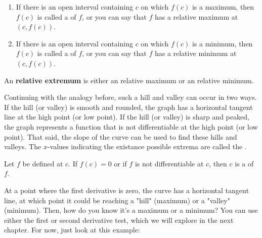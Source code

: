 \begin{definition}\hfil
    \begin{enumerate}
        \item If there is an open interval containing $c$ on which $f(c)$ is a maximum, then $f(c)$ is called a  of $f$, or you can say that $f$ has a relative maximum at $(c, f(c))$.
        \item If there is an open interval containing $c$ on which $f(c)$ is a minimum, then $f(c)$ is called a  of $f$, or you can say that $f$ has a relative minimum at $(c, f(c))$.
    \end{enumerate}
    An \textbf{relative extremum} is either an relative maximum or an relative minimum.
    \\\cite{ci}
\end{definition}

Continuing with the analogy before, such a hill and valley can occur in two ways. If the hill (or valley) is smooth and rounded, the graph has a horizontal tangent line at the high point (or low point). If the hill (or valley) is sharp and peaked, the graph represents a function that is not differentiable at the high point (or low point). \cite{ci} That said, the slope of the curve can be used to find these hills and valleys. The $x$-values indicating the existance possible extrema are called the .

\begin{definition}
    Let $f$ be defined at $c$. If $f(c)=0$ or if $f$ is not differentiable at $c$, then $c$ is a  of $f$. \cite{ci}
\end{definition}

At a point where the first derivative is zero, the curve has a horizontal tangent line, at which point it could be reaching a "hill" (maximum) or a "valley" (minimum). Then, how do you know it's a maximum or a minimum? You can use either the first or second derivative test, which we will explore in the next chapter. For now, just look at this example:\\


